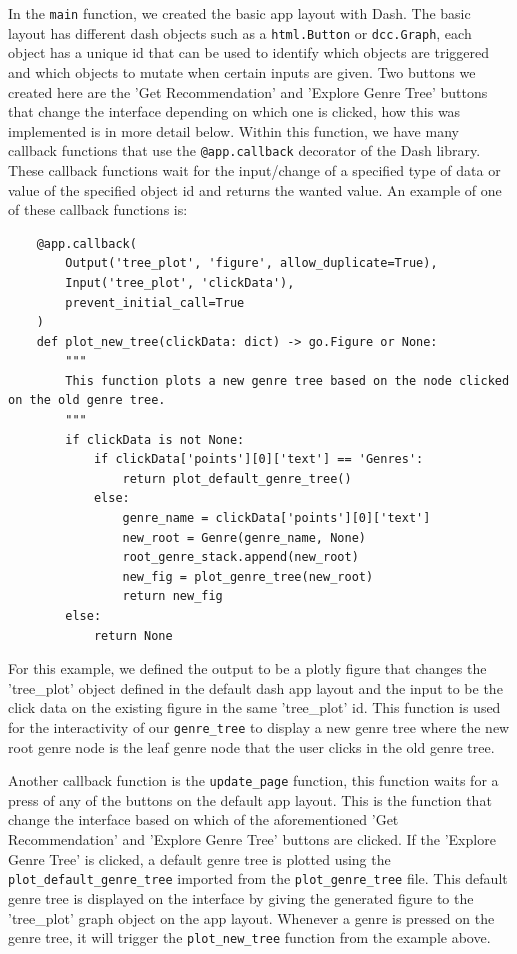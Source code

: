 \documentclass[fontsize=11pt]{article}
\begin{document}
In the \texttt{main} function, we created the basic app layout with Dash. The basic layout has different dash objects such as a \texttt{html.Button} or \texttt{dcc.Graph}, each object has a unique id that can be used to identify which objects are triggered and which objects to mutate when certain inputs are given. Two buttons we created here are the 'Get Recommendation' and 'Explore Genre Tree' buttons that change the interface depending on which one is clicked, how this was implemented is in more detail below. Within this function, we have many callback functions that use the \texttt{@app.callback} decorator of the Dash library. These callback functions wait for the input/change of a specified type of data or value of the specified object id and returns the wanted value. An example of one of these callback functions is:
\begin{verbatim}
    @app.callback(
        Output('tree_plot', 'figure', allow_duplicate=True),
        Input('tree_plot', 'clickData'),
        prevent_initial_call=True
    )
    def plot_new_tree(clickData: dict) -> go.Figure or None:
        """
        This function plots a new genre tree based on the node clicked on the old genre tree.
        """
        if clickData is not None:
            if clickData['points'][0]['text'] == 'Genres':
                return plot_default_genre_tree()
            else:
                genre_name = clickData['points'][0]['text']
                new_root = Genre(genre_name, None)
                root_genre_stack.append(new_root)
                new_fig = plot_genre_tree(new_root)
                return new_fig
        else:
            return None
\end{verbatim}
For this example, we defined the output to be a plotly figure that changes the 'tree\_plot' object defined in the default dash app layout and the input to be the click data on the existing figure in the same 'tree\_plot' id. This function is used for the interactivity of our \texttt{genre\_tree} to display a new genre tree where the new root genre node is the leaf genre node that the user clicks in the old genre tree. \newline

Another callback function is the \texttt{update\_page} function, this function waits for a press of any of the buttons on the default app layout. This is the function that change the interface based on which of the aforementioned 'Get Recommendation' and 'Explore Genre Tree' buttons are clicked. If the 'Explore Genre Tree' is clicked, a default genre tree is plotted using the \texttt{plot\_default\_genre\_tree} imported from the \texttt{plot\_genre\_tree} file. This default genre tree is displayed on the interface by giving the generated figure to the 'tree\_plot' graph object on the app layout. Whenever a genre is pressed on the genre tree, it will trigger the \texttt{plot\_new\_tree} function from the example above. \newline
\end{document}

